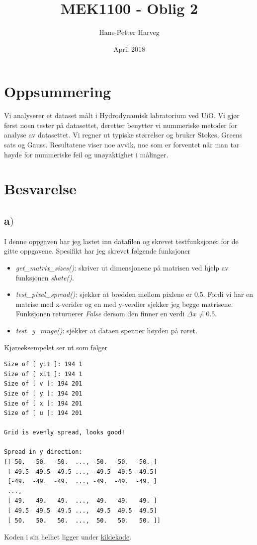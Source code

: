 \documentclass{article}
\title{MEK1100 - Oblig 2}
\author{Hans-Petter Harveg}
\date{April 2018}
\begin{document}
\maketitle

\section*{Oppsummering}
Vi analyserer et dataset målt i Hydrodynamisk labratorium ved UiO. Vi gjør først noen tester på datasettet, deretter benytter vi nummeriske metoder for analyse av datasettet. Vi regner ut typiske størrelser og bruker Stokes, Greens sats og Gauss. Resultatene viser noe avvik, noe som er forventet når man tar høyde for nummeriske feil og unøyaktighet i målinger.

\section*{Besvarelse}

\subsection*{a$)$}

I denne oppgaven har jeg lastet inn datafilen og skrevet testfunksjoner for de gitte oppgavene. Spesifikt har jeg skrevet følgende funksjoner
\begin{itemize}
\item \textit{get\_matrix\_sizes()}: skriver ut dimensjonene på matrisen ved hjelp av funksjonen \textit{shate()}.
\item \textit{test\_pixel\_spread()}: sjekker at bredden mellom pixlene er 0.5. Fordi vi har en matrise med x-verider og en med y-verdier sjekker jeg begge matrisene. Funksjonen returnerer \textit{False} dersom den finner en verdi $\Delta x \neq 0.5$.
\item \textit{test\_y\_range()}: sjekker at dataen spenner høyden på røret.
\end{itemize}
Kjøreeksempelet ser ut som følger
\begin{lstlisting}
Size of [ yit ]: 194 1
Size of [ xit ]: 194 1
Size of [ v ]: 194 201
Size of [ y ]: 194 201
Size of [ x ]: 194 201
Size of [ u ]: 194 201

Grid is evenly spread, looks good!

Spread in y direction:
[[-50.  -50.  -50.  ..., -50.  -50.  -50. ]
 [-49.5 -49.5 -49.5 ..., -49.5 -49.5 -49.5]
 [-49.  -49.  -49.  ..., -49.  -49.  -49. ]
 ..., 
 [ 49.   49.   49.  ...,  49.   49.   49. ]
 [ 49.5  49.5  49.5 ...,  49.5  49.5  49.5]
 [ 50.   50.   50.  ...,  50.   50.   50. ]]
\end{lstlisting}
Koden i sin helhet ligger under \hyperlink{sourcecode}{kildekode}.
\end{document}
